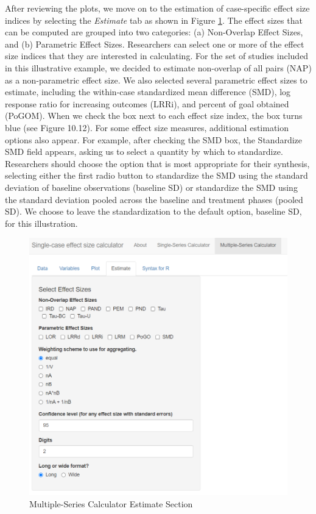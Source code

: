 \documentclass[
]{book}
\begin{document}
After reviewing the plots, we move on to the estimation of case-specific effect size indices by selecting the \emph{Estimate} tab as shown in Figure \ref{fig:multipleseries-est-empty}. The effect sizes that can be computed are grouped into two categories: (a) Non-Overlap Effect Sizes, and (b) Parametric Effect Sizes. Researchers can select one or more of the effect size indices that they are interested in calculating. For the set of studies included in this illustrative example, we decided to estimate non-overlap of all pairs (NAP) as a non-parametric effect size. We also selected several parametric effect sizes to estimate, including the within-case standardized mean difference (SMD), log response ratio for increasing outcomes (LRRi), and percent of goal obtained (PoGOM). When we check the box next to each effect size index, the box turns blue (see Figure 10.12). For some effect size measures, additional estimation options also appear. For example, after checking the SMD box, the Standardize SMD field appears, asking us to select a quantity by which to standardize. Researchers should choose the option that is most appropriate for their synthesis, selecting either the first radio button to standardize the SMD using the standard deviation of baseline observations (baseline SD) or standardize the SMD using the standard deviation pooled across the baseline and treatment phases (pooled SD). We choose to leave the standardization to the default option, baseline SD, for this illustration.

\begin{figure}
\includegraphics[width=0.6\linewidth]{images/multiseries_estimate_empty} \caption{Multiple-Series Calculator Estimate Section}\label{fig:multipleseries-est-empty}
\end{figure}
\end{document}
